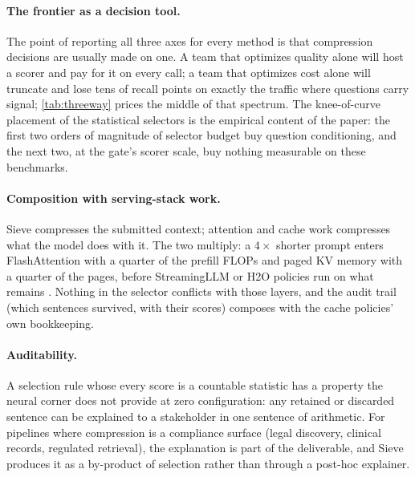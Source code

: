 \documentclass[preprint,12pt]{elsarticle}
\theoremstyle{remark}
\newcommand{\method}{Sieve}
\begin{document}
\paragraph{The frontier as a decision tool.}
The point of reporting all three axes for every method is that
compression decisions are usually made on one. A team that optimizes
quality alone will host a scorer and pay for it on every call; a team
that optimizes cost alone will truncate and lose tens of recall
points on exactly the traffic where questions carry signal;
\autoref{tab:threeway} prices the middle of that spectrum. The
knee-of-curve placement of the statistical selectors is the empirical
content of the paper: the first two orders of magnitude of selector
budget buy question conditioning, and the next two, at the gate's
scorer scale, buy nothing measurable on these benchmarks.

\paragraph{Composition with serving-stack work.}
\method{} compresses the submitted context; attention and cache work
compresses what the model does with it. The two multiply: a
$4\times$ shorter prompt enters FlashAttention
\citep{dao2022flashattention} with a quarter of the prefill FLOPs and
paged KV memory \citep{kwon2023vllm} with a quarter of the pages,
before StreamingLLM or H2O policies run on what remains
\citep{xiao2023streaming,zhang2023h2o}. Nothing in the selector
conflicts with those layers, and the audit trail (which sentences
survived, with their scores) composes with the cache policies' own
bookkeeping.

\paragraph{Auditability.}
A selection rule whose every score is a countable statistic has a
property the neural corner does not provide at zero configuration: any retained
or discarded sentence can be explained to a stakeholder in one
sentence of arithmetic. For pipelines where compression is a
compliance surface (legal discovery, clinical records, regulated
retrieval), the explanation is part of the deliverable, and \method{}
produces it as a by-product of selection rather than through a
post-hoc explainer.
\end{document}
